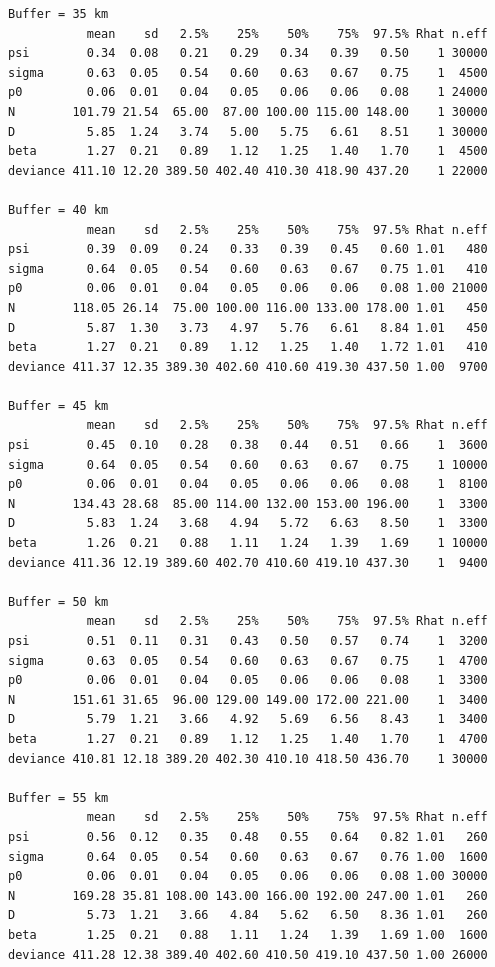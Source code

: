 {\begin{verbatim}
Buffer = 35 km
           mean    sd   2.5%    25%    50%    75%  97.5% Rhat n.eff
psi        0.34  0.08   0.21   0.29   0.34   0.39   0.50    1 30000
sigma      0.63  0.05   0.54   0.60   0.63   0.67   0.75    1  4500
p0         0.06  0.01   0.04   0.05   0.06   0.06   0.08    1 24000
N        101.79 21.54  65.00  87.00 100.00 115.00 148.00    1 30000
D          5.85  1.24   3.74   5.00   5.75   6.61   8.51    1 30000
beta       1.27  0.21   0.89   1.12   1.25   1.40   1.70    1  4500
deviance 411.10 12.20 389.50 402.40 410.30 418.90 437.20    1 22000

Buffer = 40 km
           mean    sd   2.5%    25%    50%    75%  97.5% Rhat n.eff
psi        0.39  0.09   0.24   0.33   0.39   0.45   0.60 1.01   480
sigma      0.64  0.05   0.54   0.60   0.63   0.67   0.75 1.01   410
p0         0.06  0.01   0.04   0.05   0.06   0.06   0.08 1.00 21000
N        118.05 26.14  75.00 100.00 116.00 133.00 178.00 1.01   450
D          5.87  1.30   3.73   4.97   5.76   6.61   8.84 1.01   450
beta       1.27  0.21   0.89   1.12   1.25   1.40   1.72 1.01   410
deviance 411.37 12.35 389.30 402.60 410.60 419.30 437.50 1.00  9700

Buffer = 45 km
           mean    sd   2.5%    25%    50%    75%  97.5% Rhat n.eff
psi        0.45  0.10   0.28   0.38   0.44   0.51   0.66    1  3600
sigma      0.64  0.05   0.54   0.60   0.63   0.67   0.75    1 10000
p0         0.06  0.01   0.04   0.05   0.06   0.06   0.08    1  8100
N        134.43 28.68  85.00 114.00 132.00 153.00 196.00    1  3300
D          5.83  1.24   3.68   4.94   5.72   6.63   8.50    1  3300
beta       1.26  0.21   0.88   1.11   1.24   1.39   1.69    1 10000
deviance 411.36 12.19 389.60 402.70 410.60 419.10 437.30    1  9400

Buffer = 50 km
           mean    sd   2.5%    25%    50%    75%  97.5% Rhat n.eff
psi        0.51  0.11   0.31   0.43   0.50   0.57   0.74    1  3200
sigma      0.63  0.05   0.54   0.60   0.63   0.67   0.75    1  4700
p0         0.06  0.01   0.04   0.05   0.06   0.06   0.08    1  3300
N        151.61 31.65  96.00 129.00 149.00 172.00 221.00    1  3400
D          5.79  1.21   3.66   4.92   5.69   6.56   8.43    1  3400
beta       1.27  0.21   0.89   1.12   1.25   1.40   1.70    1  4700
deviance 410.81 12.18 389.20 402.30 410.10 418.50 436.70    1 30000

Buffer = 55 km 
           mean    sd   2.5%    25%    50%    75%  97.5% Rhat n.eff
psi        0.56  0.12   0.35   0.48   0.55   0.64   0.82 1.01   260
sigma      0.64  0.05   0.54   0.60   0.63   0.67   0.76 1.00  1600
p0         0.06  0.01   0.04   0.05   0.06   0.06   0.08 1.00 30000
N        169.28 35.81 108.00 143.00 166.00 192.00 247.00 1.01   260
D          5.73  1.21   3.66   4.84   5.62   6.50   8.36 1.01   260
beta       1.25  0.21   0.88   1.11   1.24   1.39   1.69 1.00  1600
deviance 411.28 12.38 389.40 402.60 410.50 419.10 437.50 1.00 26000
\end{verbatim}
}

